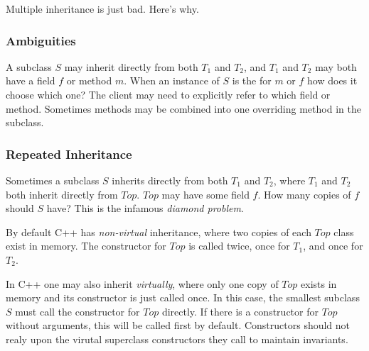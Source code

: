 \documentclass{article}
\begin{document}
Multiple inheritance is just bad. Here's why.

\subsubsection{Ambiguities}

A subclass $S$ may inherit directly from both $T_1$ and $T_2$, and $T_1$ and $T_2$ may both have a field $f$ or method $m$. When an instance of $S$ is the \receiver{} for $m$ or $f$ how does it choose which one? The client may need to explicitly refer to which field or method. Sometimes methods may be combined into one overriding method in the subclass.

\subsubsection{Repeated Inheritance}

Sometimes a subclass $S$ inherits directly from both $T_1$ and $T_2$, where $T_1$ and $T_2$ both inherit directly from $Top$. $Top$ may have some field $f$. How many copies of $f$ should $S$ have? This is the infamous \textit{diamond problem}.

By default C++ has \textit{non-virtual} inheritance, where two copies of each $Top$ class exist in memory. The constructor for $Top$ is called twice, once for $T_1$, and once for $T_2$.

In C++ one may also inherit \textit{virtually}, where only one copy of $Top$ exists in memory and its constructor is just called once.
In this case, the smallest subclass $S$ must call the constructor for $Top$ directly.
If there is a constructor for $Top$ without arguments, this will be called first by default. Constructors should not realy upon the virutal superclass constructors they call to maintain invariants.
\end{document}

